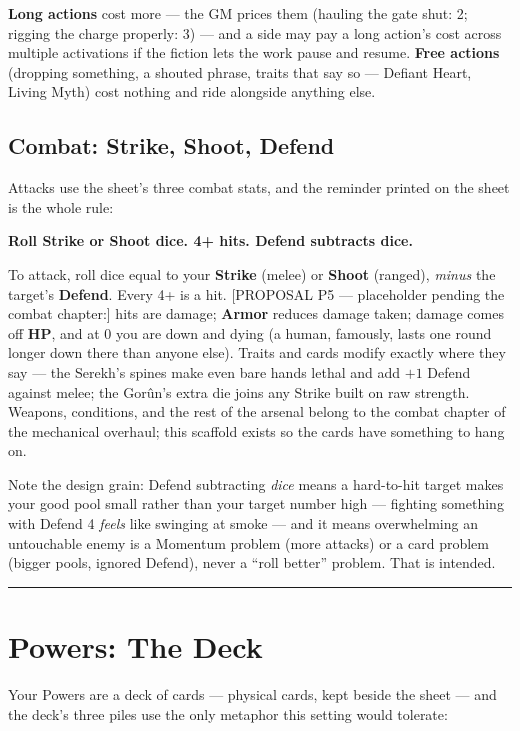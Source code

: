 \textbf{Long actions} cost more --- the GM prices them (hauling the gate shut: 2; rigging the charge properly: 3) --- and a side may pay a long action's cost across multiple activations if the fiction lets the work pause and resume. \textbf{Free actions} (dropping something, a shouted phrase, traits that say so --- Defiant Heart, Living Myth) cost nothing and ride alongside anything else.

\subsection{Combat: Strike, Shoot, Defend}

Attacks use the sheet's three combat stats, and the reminder printed on the sheet is the whole rule:

\begin{center}
\textbf{Roll Strike or Shoot dice. 4+ hits. Defend subtracts dice.}
\end{center}

To attack, roll dice equal to your \textbf{Strike} (melee) or \textbf{Shoot} (ranged), \textit{minus} the target's \textbf{Defend}. Every 4+ is a hit. [PROPOSAL P5 --- placeholder pending the combat chapter:] hits are damage; \textbf{Armor} reduces damage taken; damage comes off \textbf{HP}, and at 0 you are down and dying (a human, famously, lasts one round longer down there than anyone else). Traits and cards modify exactly where they say --- the Serekh's spines make even bare hands lethal and add $+1$ Defend against melee; the Gorûn's extra die joins any Strike built on raw strength. Weapons, conditions, and the rest of the arsenal belong to the combat chapter of the mechanical overhaul; this scaffold exists so the cards have something to hang on.

Note the design grain: Defend subtracting \textit{dice} means a hard-to-hit target makes your good pool small rather than your target number high --- fighting something with Defend 4 \textit{feels} like swinging at smoke --- and it means overwhelming an untouchable enemy is a Momentum problem (more attacks) or a card problem (bigger pools, ignored Defend), never a ``roll better'' problem. That is intended.

\medskip\hrule\medskip

\section{Powers: The Deck}

Your Powers are a deck of cards --- physical cards, kept beside the sheet --- and the deck's three piles use the only metaphor this setting would tolerate:

